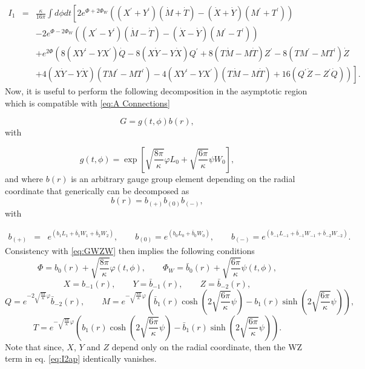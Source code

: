 \documentclass[letterpaper,11pt,oneside]{book}
\begin{document}
\begin{eqnarray}
	I_{1} & = & \frac{\kappa}{16\pi}\int d\phi dt\left[2e^{\Phi+2\Phi_{W}}\left(\left(X^{\prime}+Y^{\prime}\right)\left(\dot{M}+\dot{T}\right)-\left(\dot{X}+\dot{Y}\right)\left(M^{\prime}+T^{\prime}\right)\right)\right.\nonumber \\
	&  & \left.-2e^{\Phi-2\Phi_{W}}\left(\left(X^{\prime}-Y^{\prime}\right)\left(\dot{M}-\dot{T}\right)-\left(\dot{X}-\dot{Y}\right)\left(M^{\prime}-T^{\prime}\right)\right)\right.\label{eq:I2ap}\\
	&  & +e^{2\Phi}\left(8\left(XY^{\prime}-YX^{\prime}\right)\dot{Q}-8\left(X\dot{Y}-Y\dot{X}\right)Q^{\prime}+8\left(T\dot{M}-M\dot{T}\right)Z^{\prime}-8\left(TM^{\prime}-MT^{\prime}\right)\dot{Z}\right.\nonumber \\
	&  & \left.\left.+4\left(X\dot{Y}-Y\dot{X}\right)\left(TM^{\prime}-MT^{\prime}\right)-4\left(XY^{\prime}-YX^{\prime}\right)\left(T\dot{M}-M\dot{T}\right)+16\left(Q^{\prime}\dot{Z}-Z^{\prime}\dot{Q}\right)\right)\right].\nonumber 
\end{eqnarray}
Now, it is useful to perform the following decomposition in the asymptotic
region which is compatible with \eqref{eq:A Connections}

\[
G=g\left(t,\phi\right)b\left(r\right),
\]
with

\[
g\left(t,\phi\right)=\exp\left[\sqrt{\frac{8\pi}{\kappa}}\varphi L_{0}+\sqrt{\frac{6\pi}{\kappa}}\psi W_{0}\right],
\]
and where $b\left(r\right)$ is an arbitrary gauge group element depending
on the radial coordinate that generically can be decomposed as 
\[
b\left(r\right)=b_{\left(+\right)}b_{\left(0\right)}b_{\left(-\right)},
\]
with

\begin{eqnarray*}
	b_{\left(+\right)} & = & e^{\left(b_{1}L_{1}+\bar{b}_{1}W_{1}+\bar{b}_{2}W_{2}\right)},\qquad b_{\left(0\right)}=e^{\left(b_{0}L_{0}+\bar{b}_{0}W_{0}\right)},\qquad b_{\left(-\right)}=e^{\left(b_{-1}L_{-1}+\bar{b}_{-1}W_{-1}+\bar{b}_{-2}W_{-2}\right)}.
\end{eqnarray*}
Consistency with \eqref{eq:GWZW} then implies the following conditions
\[
\Phi=b_{0}\left(r\right)+\sqrt{\frac{8\pi}{\kappa}}\varphi\left(t,\phi\right),\qquad\Phi_{W}=\bar{b}_{0}\left(r\right)+\sqrt{\frac{6\pi}{\kappa}}\psi\left(t,\phi\right),
\]
\[
X=b_{-1}\left(r\right),\qquad Y=\bar{b}_{-1}\left(r\right),\qquad Z=\bar{b}_{-2}\left(r\right),
\]
\[
Q=e^{-2\sqrt{\frac{8\pi}{\kappa}}\varphi}\bar{b}_{-2}\left(r\right),\qquad M=e^{-\sqrt{\frac{8\pi}{\kappa}}\varphi}\left(\bar{b}_{1}\left(r\right)\cosh\left(2\sqrt{\frac{6\pi}{\kappa}}\psi\right)-b_{1}\left(r\right)\sinh\left(2\sqrt{\frac{6\pi}{\kappa}}\psi\right)\right),
\]
\[
T=e^{-\sqrt{\frac{8\pi}{\kappa}}\varphi}\left(b_{1}\left(r\right)\cosh\left(2\sqrt{\frac{6\pi}{\kappa}}\psi\right)-\bar{b}_{1}\left(r\right)\sinh\left(2\sqrt{\frac{6\pi}{\kappa}}\psi\right)\right).
\]
Note that since, $X$, $Y$ and $Z$ depend only on the radial coordinate,
then the WZ term in eq. \eqref{eq:I2ap} identically vanishes.


\newpage

\singlespacing
\thispagestyle{empty}



\end{document}
